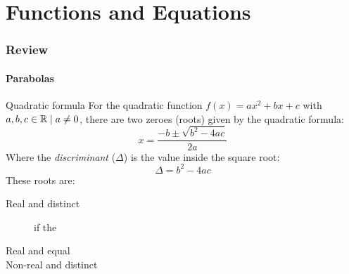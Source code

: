 \part{Functions and Equations}\label{part:functionsAndEquations}
\frame{\partpage}
\section{Review}
\subsection{Parabolas}
\begin{namedframe}{Quadratic formula}
	For the quadratic function $f(x) = ax^2 + bx + c$ with $a, b, c \in \mathbb{R} \mid a \neq 0$, there are two zeroes (roots) given by the quadratic formula:
	\[x = \frac{-b \pm \sqrt{b^2 - 4ac}}{2a}\]
	Where the \emph{discriminant} ($\Delta$) is the value inside the square root:
	\[\Delta = b^2 - 4ac\]
	These roots are:
	\begin{description}
		\item[Real and distinct] if the 
		\item[Real and equal]
		\item[Non-real and distinct]
	\end{description}
\end{namedframe}
